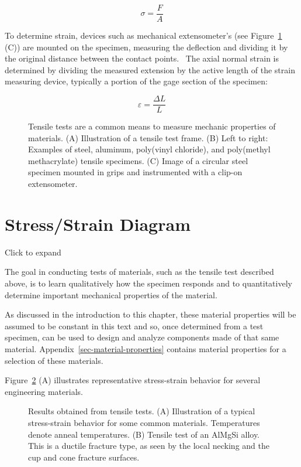 \documentclass[
  letterpaper,
  DIV=11,
  numbers=noendperiod]{scrreprt}
\theoremstyle{definition}
\theoremstyle{remark}
\begin{document}
\[
\sigma=\frac{F}{A}
\]

To determine strain, devices such as mechanical extensometer's (see
Figure~\ref{fig-4.1} (C)) are mounted on the specimen, measuring the
deflection and dividing it by the original distance between the contact
points.~ The axial normal strain is determined by dividing the measured
extension by the active length of the strain measuring device, typically
a portion of the gage section of the specimen:

\[
\varepsilon=\frac{\Delta L}{L}
\]

\begin{figure}


\caption{\label{fig-4.1}Tensile tests are a common means to measure
mechanic properties of materials. (A) Illustration of a tensile test
frame. (B) Left to right: Examples of steel, aluminum, poly(vinyl
chloride), and poly(methyl methacrylate) tensile specimens. (C) Image of
a circular steel specimen mounted in grips and instrumented with a
clip-on extensometer.}

\end{figure}%

\section{Stress/Strain Diagram}\label{sec-4.2}

Click to expand

The goal in conducting tests of materials, such as the tensile test
described above, is to learn qualitatively how the specimen responds and
to quantitatively determine important mechanical properties of the
material.

As discussed in the introduction to this chapter, these material
properties will be assumed to be constant in this text and so, once
determined from a test specimen, can be used to design and analyze
components made of that same material.
Appendix~\ref{sec-material-properties} contains material properties for
a selection of these materials.

Figure~\ref{fig-4.2} (A) illustrates representative stress-strain
behavior for several engineering materials.

\begin{figure}


\caption{\label{fig-4.2}Results obtained from tensile tests. (A)
Illustration of a typical stress-strain behavior for some common
materials. Temperatures denote anneal temperatures. (B) Tensile test of
an AlMgSi alloy. This is a ductile fracture type, as seen by the local
necking and the cup and cone fracture surfaces.}

\end{figure}%
\end{document}
